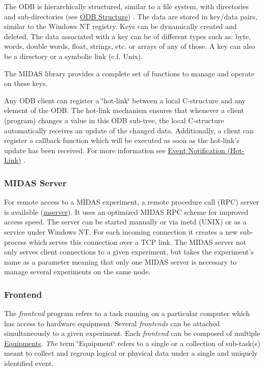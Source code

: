 The ODB is hierarchically structured, similar to a file system, with directories and sub-\/directories (see \hyperlink{F_ODB_Structure}{ODB Structure}) . The data are stored in key/data pairs, similar to the Windows NT registry. Keys can be dynamically created and deleted. The data associated with a key can be of different types such as: byte, words, double words, float, strings, etc. or arrays of any of those. A key can also be a directory or a symbolic link (c.f. Unix).

\label{F_MainElements_idx_hotlink_overview}
\hypertarget{F_MainElements_idx_hotlink_overview}{}
 The MIDAS library provides a complete set of functions to manage and operate on these keys. \par
 Any ODB client can register a \char`\"{}hot-\/link\char`\"{} between a local C-\/structure and any element of the ODB. The hot-\/link mechanism ensures that whenever a client (program) changes a value in this ODB sub-\/tree, the local C-\/structure automatically receives an update of the changed data. Additionally, a client can register a callback function which will be executed as soon as the hot-\/link's update has been received. For more information see \hyperlink{RC_Hot_Link}{Event Notification (Hot-\/Link)} .

\label{F_MainElements_idx_midas_server}
\hypertarget{F_MainElements_idx_midas_server}{}
 \hypertarget{F_MainElements_F_Midas_Server_overview}{}\subsubsection{MIDAS Server}\label{F_MainElements_F_Midas_Server_overview}
For remote access to a MIDAS experiment, a remote procedure call (RPC) server is available (\hyperlink{RC_customize_ODB_RC_mserver_utility}{mserver}). It uses an optimized MIDAS RPC scheme for improved access speed. The server can be started manually or via inetd (UNIX) or as a service under Windows NT. For each incoming connection it creates a new sub-\/process which serves this connection over a TCP link. The MIDAS server not only serves client connections to a given experiment, but takes the experiment's name as a parameter meaning that only one MIDAS server is necessary to manage several experiments on the same node.

\label{F_MainElements_idx_frontend_program_overview}
\hypertarget{F_MainElements_idx_frontend_program_overview}{}
 \hypertarget{F_MainElements_F_Frontend_sec_overview}{}\subsubsection{Frontend}\label{F_MainElements_F_Frontend_sec_overview}
The {\itshape frontend\/} program refers to a task running on a particular computer which has access to hardware equipment. Several {\itshape frontends\/} can be attached simultaneously to a given experiment. Each {\itshape frontend\/} can be composed of multiple \hyperlink{FrontendOperation_Equipment_definition}{Equipments}. {\itshape The\/} term \char`\"{}Equipment\char`\"{} refers to a single or a collection of sub-\/task(s) meant to collect and regroup logical or physical data under a single and uniquely identified event.

